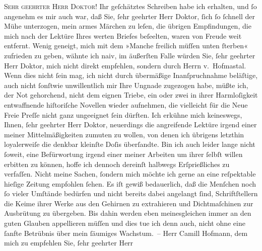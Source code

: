 \pstart{}\textsc{Sehr geehrter Herr Doktor!}\pend\vspace{0.5em}
\pstart
           Ihr geſchätztes Schreiben habe ich erhalten, und ſo angenehm es mir auch war, daß
               Sie, ſehr geehrter Herr Doktor, ſich ſo ſchnell der Mühe unterzogen, mein armes Märchen zu leſen, die übrigen
               Empfindungen, die mich nach der Lektüre Ihres werten Briefes beſeelten, waren von
               Freude weit entfernt. Wenig geneigt, mich mit dem »Manche freilich müſſen unten ſterben« zufrieden zu geben,
               wähnte ich naiv, im äußerſten Falle würden Sie, ſehr geehrter Herr Doktor, mich nicht
               direkt empfehlen, sondern durch Herrn v. Hofma{\geminationn}stal. Wenn dies nicht ſein mag, ich nicht durch
               übermäßige Inanſpruchnahme beläſtige, auch nicht {\pb}ſonſtwie unwillentlich mir Ihre Ungnade
               zugezogen habe, müßte ich, der Not gehorchend, nicht dem eignen Triebe, ein oder zwei
               in ihrer Harmloſigkeit entwaffnende hiſtoriſche Novellen wieder aufnehmen, die
               vielleicht für die Neue Freie Preſſe nicht ganz
               ungeeignet ſein dürften. Ich erkühne mich keineswegs, Ihnen, ſehr geehrter Herr
               Doktor, neuerdings die angreifende Lektüre irgend einer meiner Mittelmäßigkeiten
               zumuten zu wollen, von denen ich übrigens letzthin loyalerweiſe die denkbar kleinſte
               Doſis überſandte. Bin ich auch leider lange nicht ſoweit, eine Befürwortung irgend
               einer meiner Arbeiten um ihrer ſelbſt willen erbitten zu können, hoffe ich dennoch
               dereinſt halbwegs Erſprießliches zu verfaſſen. Nicht meine Sachen, {\pb}ſondern mich möchte ich gerne an eine
               reſpektable hieſige Zeitung empfohlen ſehen. Es iſt gewiß bedauerlich, daß die
               Menſchen noch ſo vieler Umſtände bedürfen und nicht bereits dabei angelangt ſind,
               Schriftſtellern die Keime ihrer Werke aus den Gehirnen zu extrahieren und
               Dichtmaſchinen zur Ausbrütung zu übergeben. Bis dahin werden eben meinesgleichen
               immer an den guten Glauben appellieren müſſen und dies tue ich denn auch, nicht ohne
               eine ſanfte Betrübnis über mein ſäumiges Wachstum. – Herr Camill Hofmann, dem mich zu empfehlen Sie, ſehr geehrter Herr
